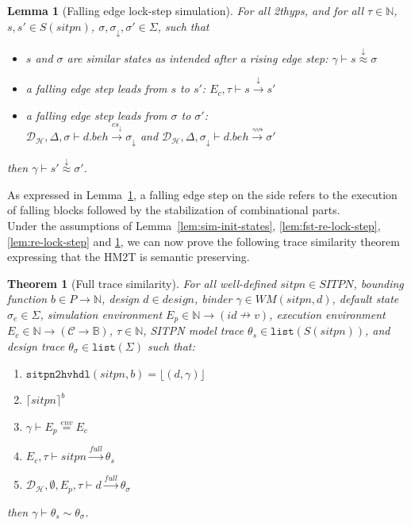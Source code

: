 \documentclass[pdflatex,sn-mathphys]{sn-jnl}%
\theoremstyle{thmstyleone}%
\newtheorem{theorem}{Theorem}%
\theoremstyle{thmstyletwo}%
\theoremstyle{thmstylethree}%
\newtheorem{lemma}{Lemma}%
\begin{document}
\begin{lemma}[Falling edge lock-step simulation]
  \label{lem:fe-lock-step}
  For all \hm2thyps{}, and for all $\tau\in\mathbb{N}$,
  $s,s'\in{}S(sitpn)$, $\sigma,\sigma_\downarrow,\sigma'\in\Sigma$,
  such that
  \begin{itemize}
  \item $s$ and $\sigma$ are similar states as intended after a rising
    edge step: $\gamma\vdash{}s\stackrel{\downarrow}{\approx}\sigma$
  \item a falling edge step leads from $s$ to $s'$:
    $E_c,\tau\vdash{}s\xrightarrow{\downarrow}s'$
  \item a falling edge step leads from $\sigma$ to $\sigma'$:\\
    $\mathcal{D}_\mathcal{H},\Delta,\sigma\vdash{}d.beh\xrightarrow{cs_{\downarrow}}\sigma_{\downarrow}$
    and
    $\mathcal{D}_\mathcal{H},\Delta,\sigma_{\downarrow}\vdash{}d.beh\xrightarrow{\rightsquigarrow}\sigma'$
  \end{itemize}
  then $\gamma\vdash{}s'\stackrel{\downarrow}{\approx}{}\sigma'$.
\end{lemma}

As expressed in Lemma~\ref{lem:fe-lock-step}, a falling edge step on
the \hvhdl{} side refers to the execution of falling blocks followed
by the stabilization of combinational parts.\\

Under the assumptions of Lemma~\ref{lem:sim-init-states},
\ref{lem:fst-re-lock-step}, \ref{lem:re-lock-step} and
\ref{lem:fe-lock-step}, we can now prove the following trace
similarity theorem expressing that the HM2T is semantic preserving.

\begin{theorem}[Full trace similarity]
  \label{thm:full-trace-sim}
  For all well-defined $sitpn\in{}SITPN$, bounding function
  $b\in{}P\rightarrow\mathbb{N}$, \hvhdl{} design $d\in{}design$,
  binder $\gamma\in{}WM(sitpn,d)$, default state $\sigma_e\in\Sigma$,
  simulation environment
  $E_p\in\mathbb{N}\rightarrow{}(id\nrightarrow{}v)$, execution
  environment
  $E_c\in\mathbb{N}\rightarrow(\mathcal{C}\rightarrow\mathbb{B})$,
  $\tau\in\mathbb{N}$, SITPN model trace
  $\theta_s\in\mathtt{list}(S(sitpn))$, and \hvhdl{} design trace
  $\theta_\sigma\in\mathtt{list}(\Sigma)$ such that:
  \begin{enumerate}
  \item $\mathtt{sitpn2hvhdl}(sitpn, b)=\lfloor(d,\gamma)\rfloor$
  \item $\lceil{}sitpn\rceil^b$
  \item $\gamma\vdash{}E_p\stackrel{env}{=}E_c$
  \item $E_c,\tau\vdash{}sitpn\xrightarrow{full}\theta_s$
  \item
    $\mathcal{D}_\mathcal{H},\emptyset,E_p,\tau\vdash{}d\xrightarrow{full}\theta_\sigma$
  \end{enumerate}
  then $\gamma\vdash\theta_s\sim\theta_\sigma$.
\end{theorem}
\end{document}
